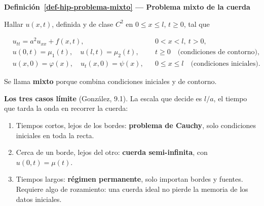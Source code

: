 \documentclass[
  spanish,
  a4paper,
]{scrbook}
\providecommand{\tightlist}{%
  \setlength{\itemsep}{0pt}\setlength{\parskip}{0pt}}
\theoremstyle{definition}
\theoremstyle{plain}
\theoremstyle{definition}
\theoremstyle{plain}
\theoremstyle{definition}
\theoremstyle{remark}
\begin{document}
\begin{tcolorbox}[enhanced jigsaw, arc=.35mm, bottomrule=.15mm, breakable, colback=white, colframe=quarto-callout-note-color-frame, left=2mm, leftrule=.75mm, opacityback=0, rightrule=.15mm, toprule=.15mm]
\begin{minipage}[t]{5.5mm}
\textcolor{quarto-callout-note-color}{\faInfo}
\end{minipage}%
\begin{minipage}[t]{\textwidth - 5.5mm}

\vspace{-3mm}\textbf{Definición~\ref{def-hip-problema-mixto} --- Problema mixto de la cuerda}\vspace{3mm}

Hallar \(u(x,t)\), definida y de clase \(C^2\) en \(0\le x\le l\),
\(t\ge 0\), tal que

\[
\begin{aligned}
&u_{tt} = a^2u_{xx} + f(x,t), && 0<x<l,\ t>0, \\
&u(0,t) = \mu_1(t),\quad u(l,t) = \mu_2(t), && t\ge 0 \quad\text{(condiciones de contorno)},\\
&u(x,0) = \varphi(x),\quad u_t(x,0) = \psi(x), && 0\le x\le l \quad\text{(condiciones iniciales)}.
\end{aligned}
\]

Se llama \textbf{mixto} porque combina condiciones iniciales y de
contorno.

\end{minipage}%
\end{tcolorbox}

\textbf{Los tres casos límite} (González, 9.1). La escala que decide es
\(l/a\), el tiempo que tarda la onda en recorrer la cuerda:

\begin{enumerate}
\def\labelenumi{\arabic{enumi}.}
\tightlist
\item
  Tiempos cortos, lejos de los bordes: \textbf{problema de Cauchy}, solo
  condiciones iniciales en toda la recta.
\item
  Cerca de un borde, lejos del otro: \textbf{cuerda semi-infinita}, con
  \(u(0,t) = \mu(t)\).
\item
  Tiempos largos: \textbf{régimen permanente}, solo importan bordes y
  fuentes. Requiere algo de rozamiento: una cuerda ideal no pierde la
  memoria de los datos iniciales.
\end{enumerate}
\end{document}
